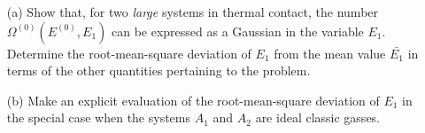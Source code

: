 \begin{itemize}
  \item[(a)] Show that, for two \emph{large} systems in thermal
    contact, the number $\Omega^{(0)}(E^{(0)},E_{1})$ can
    be expressed as a Gaussian in the variable $E_{1}$.  Determine the
    root-mean-square deviation of $E_1$ from the mean value
    $\bar{E_1}$ in terms of the other quantities pertaining to the
    problem.
  \item[(b)] Make an explicit evaluation of the root-mean-square
    deviation of $E_1$ in the special case when the systems $A_1$ and
    $A_2$ are ideal classic gasses.
\end{itemize}
